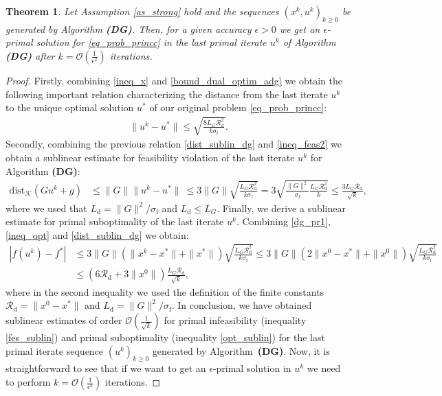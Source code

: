 \documentclass{gOMS2e}
\theoremstyle{plain}
\newtheorem{theorem}{Theorem}[section]
\theoremstyle{definition}
\theoremstyle{remark}
\begin{document}
\begin{theorem}
\label{th_dglast} Let Assumption \ref{as_strong} hold and the
sequences $\left(x^k,u^k\right)_{k\geq 0}$ be generated by Algorithm
{\bf (DG)}. Then, for a given accuracy $\epsilon>0$ we get an
$\epsilon$-primal solution for \eqref{eq_prob_princc} in the last
primal  iterate $u^k$ of Algorithm \textbf{(DG)} after $k =
{\mathcal O} (\frac{1}{\epsilon^2})$ iterations.
\end{theorem}
\begin{proof}  Firstly, combining \eqref{ineq_x} and
\eqref{bound_dual_optim_adg} we obtain the following important
relation characterizing the distance from the last iterate $u^k$ to
the unique optimal solution $u^*$ of our original problem
\eqref{eq_prob_princc}:
\begin{align}
\label{dist_sublin_dg} \| u^k - u^* \| \leq  \sqrt{\frac{8 L_G
\mathcal{R}_\text{d}^2}{k \sigma_\text{f}}}.
\end{align}
Secondly, combining the previous relation \eqref{dist_sublin_dg} and
\eqref{ineq_feas2} we obtain a sublinear estimate for feasibility
violation of the last iterate $u^k$ for Algorithm \textbf{(DG)}:
\begin{align}
\label{fes_sublin}  \text{dist}_{\mathcal{K}}(Gu^k + g)  & \leq
\|G\| \| {}{u}^k - u^* \| \ \leq  3 \|G\| \sqrt{\frac{ L_G
 \mathcal{R}_\text{d}^2}{k \sigma_\text{f}}}  = 3\sqrt{\frac{\|G\|^2}{\sigma_\text{f}} \frac{L_G
\mathcal{R}_\text{d}^2}{k}} \leq \frac{3 L_G
\mathcal{R}_\text{d}}{\sqrt{k}},
\end{align}
where we used that $L_\text{d} = \|G\|^2/\sigma_\text{f}$ and
$L_\text{d} \leq L_G$. Finally, we derive a sublinear estimate for
primal suboptimality of the last iterate $u^k$. Combining
\eqref{dg_pr1}, \eqref{ineq_opt} and \eqref{dist_sublin_dg}  we
obtain:
\begin{align}
\label{opt_sublin} |f(u^k) - f^*| & \leq   3 \|G\| (\|x^k - x^*\| +
\|x^*\|)  \sqrt{\frac{ L_G \mathcal{R}_\text{d}^2}{k \sigma_\text{f}}}
\leq  3 \|G\|(2 \|x^0 - x^*\| + \|x^0\|) \sqrt{\frac{ L_G \mathcal{R}_\text{d}^2}{k \sigma_\text{f}}} \nonumber \\
& \leq  (6  \mathcal{R}_\text{d} + 3 \|x^0\|) \frac{L_G
\mathcal{R}_\text{d}}{\sqrt{k}},
\end{align}
where in the second inequality we used   the definition of the
finite constants $\mathcal{R}_\text{d} = \| x^0 - x^*\|$ and
$L_\text{d} = \|G\|^2/\sigma_\text{f}$. In conclusion, we have
obtained sublinear estimates  of order
$\mathcal{O}(\frac{1}{\sqrt{k}})$ for primal infeasibility
(inequality \eqref{fes_sublin}) and primal suboptimality (inequality
\eqref{opt_sublin}) for the last primal iterate sequence $(u^k)_{k
\geq 0}$ generated by  Algorithm~\textbf{(DG)}. Now, it is
straightforward to see that if we want to get an $\epsilon$-primal
solution in $u^k$ we need to perform $k = {\mathcal O}
(\frac{1}{\epsilon^2})$ iterations.
\end{proof}
\end{document}
